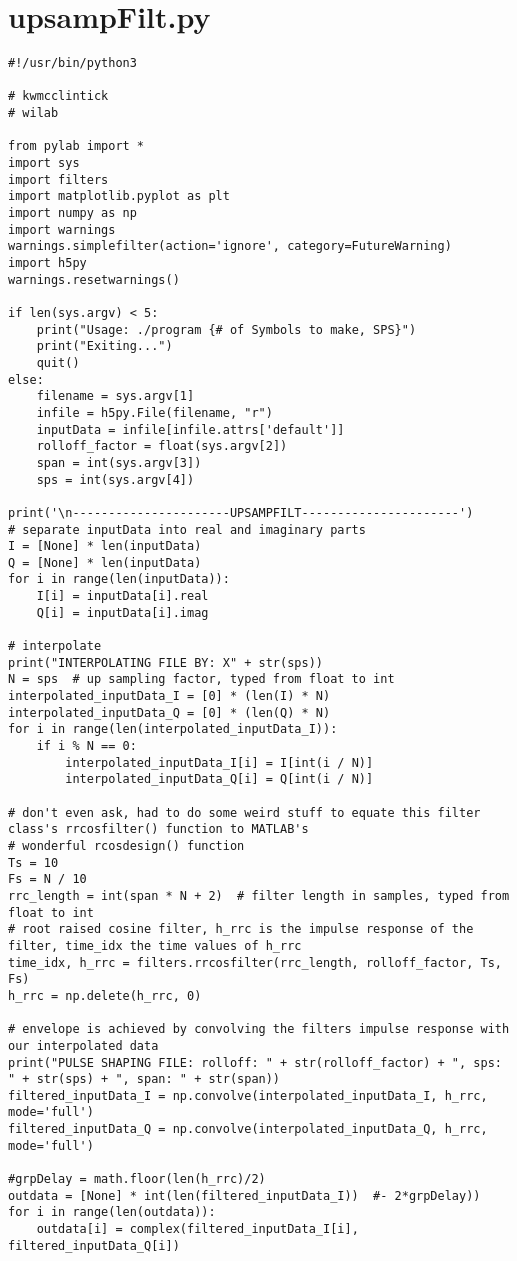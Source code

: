 \section{upsampFilt.py}
\begin{lstlisting}[breaklines]
#!/usr/bin/python3

# kwmcclintick
# wilab

from pylab import *
import sys
import filters
import matplotlib.pyplot as plt
import numpy as np
import warnings
warnings.simplefilter(action='ignore', category=FutureWarning)
import h5py
warnings.resetwarnings()

if len(sys.argv) < 5:
	print("Usage: ./program {# of Symbols to make, SPS}")
	print("Exiting...")
	quit()
else:
	filename = sys.argv[1]
	infile = h5py.File(filename, "r")
	inputData = infile[infile.attrs['default']]
	rolloff_factor = float(sys.argv[2])
	span = int(sys.argv[3])
	sps = int(sys.argv[4])

print('\n----------------------UPSAMPFILT----------------------')
# separate inputData into real and imaginary parts
I = [None] * len(inputData)
Q = [None] * len(inputData)
for i in range(len(inputData)):
	I[i] = inputData[i].real
	Q[i] = inputData[i].imag

# interpolate
print("INTERPOLATING FILE BY: X" + str(sps))
N = sps  # up sampling factor, typed from float to int
interpolated_inputData_I = [0] * (len(I) * N)
interpolated_inputData_Q = [0] * (len(Q) * N)
for i in range(len(interpolated_inputData_I)):
	if i % N == 0:
		interpolated_inputData_I[i] = I[int(i / N)]
		interpolated_inputData_Q[i] = Q[int(i / N)]

# don't even ask, had to do some weird stuff to equate this filter class's rrcosfilter() function to MATLAB's
# wonderful rcosdesign() function
Ts = 10
Fs = N / 10
rrc_length = int(span * N + 2)  # filter length in samples, typed from float to int
# root raised cosine filter, h_rrc is the impulse response of the filter, time_idx the time values of h_rrc
time_idx, h_rrc = filters.rrcosfilter(rrc_length, rolloff_factor, Ts, Fs)
h_rrc = np.delete(h_rrc, 0)

# envelope is achieved by convolving the filters impulse response with our interpolated data
print("PULSE SHAPING FILE: rolloff: " + str(rolloff_factor) + ", sps: " + str(sps) + ", span: " + str(span))
filtered_inputData_I = np.convolve(interpolated_inputData_I, h_rrc, mode='full')
filtered_inputData_Q = np.convolve(interpolated_inputData_Q, h_rrc, mode='full')

#grpDelay = math.floor(len(h_rrc)/2)
outdata = [None] * int(len(filtered_inputData_I))  #- 2*grpDelay))
for i in range(len(outdata)):
	outdata[i] = complex(filtered_inputData_I[i], filtered_inputData_Q[i])


\end{lstlisting}
